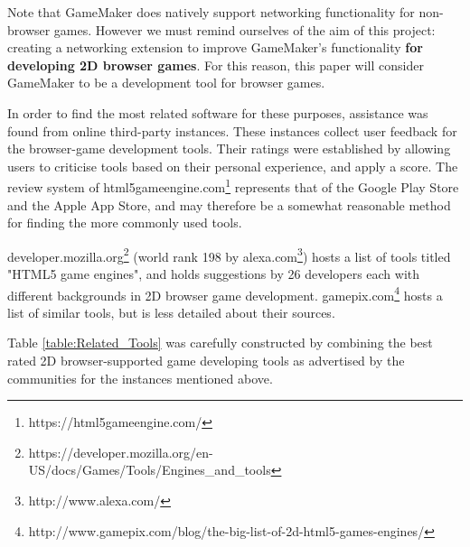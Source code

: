 \documentclass[bsc,frontabs,twoside,singlespacing,parskip,deptreport]{infthesis}     %
\begin{document}
Note that GameMaker does natively support networking functionality for non-browser games. However we must remind ourselves of the aim of this project: creating a networking extension to improve GameMaker's functionality \textbf{for developing 2D browser games}. For this reason, this paper will consider GameMaker to be a development tool for browser games.

In order to find the most related software for these purposes, assistance was found from online third-party instances. These instances collect user feedback for the browser-game development tools. Their ratings were established by allowing users to criticise tools based on their personal experience, and apply a score. The review system of html5gameengine.com\footnote{https://html5gameengine.com/} represents that of the Google Play Store\cite{Google_Play_Store} and the Apple App Store\cite{Apple_App_Store}, and may therefore be a somewhat reasonable method for finding the more commonly used tools.

developer.mozilla.org\footnote{https://developer.mozilla.org/en-US/docs/Games/Tools/Engines\_and\_tools} (world rank 198 by alexa.com\footnote{http://www.alexa.com/}) hosts a list of tools titled "HTML5 game engines", and holds suggestions by 26 developers each with different backgrounds in 2D browser game development. gamepix.com\footnote{http://www.gamepix.com/blog/the-big-list-of-2d-html5-games-engines/} hosts a list of similar tools, but is less detailed about their sources.

Table \ref{table:Related_Tools} was carefully constructed by combining the best rated 2D browser-supported game developing tools as advertised by the communities for the instances mentioned above.
\end{document}
